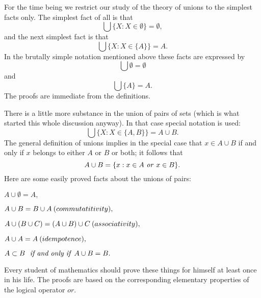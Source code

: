 For the time being we restrict our study of the theory of unions to the simplest facts only. The simplest fact of all is that
\begin{equation*}
\bigcup \{ X: X \in \emptyset \} = \emptyset ,
\end{equation*}
and the next simplest fact is that 
\begin{equation*}
\bigcup \{ X: X \in \{ A \} \} = A.
\end{equation*}
In the brutally simple notation mentioned above these facts are expressed by
\begin{equation*}
\bigcup \emptyset = \emptyset
\end{equation*}
and
\begin{equation*}
\bigcup \{ A \} = A.
\end{equation*}
The proofs are immediate from the definitions.

There is a little more substance in the union of pairs of sets (which is what started this whole discussion anyway). In that case special notation is used: 
\begin{equation*}
\bigcup \{ X: X \in \{A, B \} \} = A \cup B.
\end{equation*}
The general definition of unions implies in the special case that $x \in A \cup B$ if and only if $x$ belongs to either $A$ or $B$ or both; it follows that 
\begin{equation*}
A \cup B = \{x: x \in A \text{ \textit{or} } x \in B \}.
\end{equation*}
Here are some easily proved facts about the unions of pairs:
\begin{center}
$A \cup \emptyset = A,$

$A \cup B =  B \cup A \: (commutatitivity)\index{commutative},$

$A \cup (B \cup C) = (A \cup B) \cup C \: (associativity)\index{associative},$

$A \cup A = A \:(idempotence)\index{idempotent},$

$ A \subset B \text{ \textit{ if and only if} } A \cup B = B.$
\end{center}
Every student of mathematics should prove these things for himself at least once in his life. The proofs are based on the corresponding elementary properties of the logical operator $or$.

